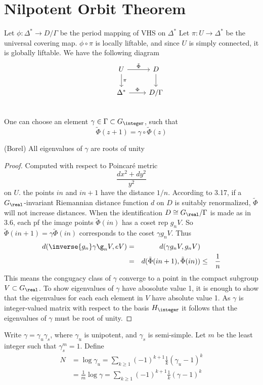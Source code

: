 \documentclass{article}
\begin{document}
\section{Nilpotent Orbit Theorem}
Let $\phi: \Delta^* \rightarrow D/\Gamma$ be the period mapping of VHS on $\Delta^*$
Let $\pi: U \rightarrow \Delta^*$ be the universal covering map. $\phi\circ\pi$ is locally
liftable, and since $U$ is simply connected, it is globally liftable. We have the following diagram
\[
\begin{tikzcd}
    & U \arrow{r}{\tilde{\Phi}}\arrow{d}{\pi} 
        & D \arrow{d} \\
    & \Delta^* \arrow{r}{\Phi} 
        & D/\Gamma \\
\end{tikzcd}
\]
One can choose an element $\gamma \in \Gamma\subset G_{\integer}$, such that
\[
    \tilde{\Phi}(z+1) = \gamma\circ\tilde{\Phi}(z)
\]
\begin{lemma}(Borel)
All eigenvalues of $\gamma$ are roots of unity
\end{lemma}
\begin{proof}
Computed with respect to Poincar\'e metric 
\[
    \frac{dx^2 + dy^2}{y^2}
\]
on $U$. the points $in$ and $in + 1$ have the distance $1/n$.
According to 3.17, if a $G_{\real}$-invariant Riemannian distance function $d$
on $D$ is suitably renormalized, $\tilde{\Phi}$ will not increase distances.
When the identification $D \cong G_{\real}/\Gamma$ is made as in 3.6, each
pf the image points $\tilde{\Phi}(in)$ has a coset rep $g_nV$. So
$\tilde{\Phi}(in + 1) = \gamma\tilde{\Phi}(in)$ corresponds to the coset $\gamma g_nV$.
Thus
\begin{align*}
    d(\inverse{g_n}\gamma\g_n V, eV) & = & d(\gamma g_nV, g_nV) \\
                                     & = & d(\tilde{\Phi}(in+1), \tilde{\Phi}(in))
                                     & \le & \frac{1}{n}
\end{align*}
This means the congugacy class of $\gamma$ converge to a point in the compact subgroup
$V \subset G_{\real}$. To show eigenvalues of $\gamma$ have abosolute value 1, 
it is enough to show that the eigenvalues for each each element in $V$ have absolute 
value 1. As $\gamma$ is integer-valued matrix with respect to the basis $H_{\integer}$
it follows that the eigenvalues of $\gamma$ must be root of unity. 
\end{proof}


Write $\gamma = \gamma_u\gamma_s$, where $\gamma_u$ is unipotent, and $\gamma_s$
is semi-simple. Let $m$ be the least integer such that $\gamma_s^m = 1$. Define
\begin{align*}
    N & = \log\gamma_u = \sum\limits_{k\ge 1}(-1)^{k+1}\frac{1}{k}(\gamma_u-1)^k \\
      & = \frac{1}{m}\log\gamma = \sum\limits_{k\ge 1}(-1)^{k+1}\frac{1}{k}(\gamma - 1)^k 
\end{align*}
\end{document}
